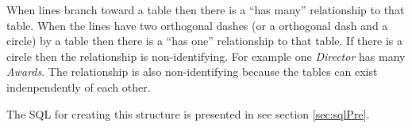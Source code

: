 When lines branch toward a table then there is a ``has many'' relationship to
that table. When the lines have two orthogonal dashes (or a orthogonal dash and
a circle) by a table then there is a
``has one'' relationship to that table. If there is a circle then the
relationship is non-identifying.
For example one \emph{Director} has many \emph{Awards}. The relationship is
also non-identifying because the tables can exist indenpendently of each other.

The SQL for creating this structure is presented in see section \ref{sec:sqlPre}.


